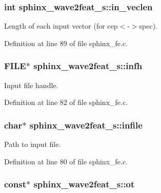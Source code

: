 \subsubsection[{in\-\_\-veclen}]{\setlength{\rightskip}{0pt plus 5cm}int {\bf sphinx\-\_\-wave2feat\-\_\-s\-::in\-\_\-veclen}}\label{structsphinx__wave2feat__s_a3410a9e0c05c0057f31452550fb5380a}


\-Length of each input vector (for cep$<$-\/$>$spec). 



\-Definition at line 89 of file sphinx\-\_\-fe.\-c.

\subsubsection[{infh}]{\setlength{\rightskip}{0pt plus 5cm}\-F\-I\-L\-E$\ast$ {\bf sphinx\-\_\-wave2feat\-\_\-s\-::infh}}\label{structsphinx__wave2feat__s_ad86834e597d4677aed93e7c06cebccb7}


\-Input file handle. 



\-Definition at line 82 of file sphinx\-\_\-fe.\-c.

\subsubsection[{infile}]{\setlength{\rightskip}{0pt plus 5cm}char$\ast$ {\bf sphinx\-\_\-wave2feat\-\_\-s\-::infile}}\label{structsphinx__wave2feat__s_a6d4d1b1be4e3a3c1de82943e9e6fa65c}


\-Path to input file. 



\-Definition at line 80 of file sphinx\-\_\-fe.\-c.

\subsubsection[{ot}]{ const$\ast$ {\bf sphinx\-\_\-wave2feat\-\_\-s\-::ot}}\label{structsphinx__wave2feat__s_a929e05e041ad922f6a2e35637a98c917}


